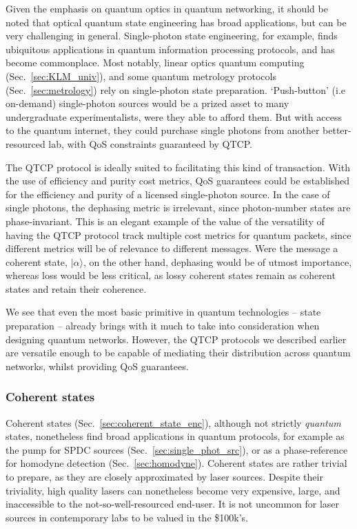 \documentclass[aps, rmp, twocolumn, amsmath, amssymb, nofootinbib, superscriptaddress, longbibliography, floatfix, table-of-contents, eqsecnum]{revtex4-1}
\newcommand{\ket}[1]{|#1\rangle}
\begin{document}
Given the emphasis on quantum optics in quantum networking, it should be noted that optical quantum state engineering has broad applications, but can be very challenging in general. Single-photon state engineering, for example, finds ubiquitous applications in quantum information processing protocols, and has become commonplace. Most notably, linear optics quantum computing (Sec.~\ref{sec:KLM_univ}), and some quantum metrology protocols (Sec.~\ref{sec:metrology}) rely on single-photon state preparation. `Push-button' (i.e on-demand) single-photon sources would be a prized asset to many undergraduate experimentalists, were they able to afford them. But with access to the quantum internet, they could purchase single photons from another better-resourced lab, with QoS constraints guaranteed by QTCP.

The QTCP protocol is ideally suited to facilitating this kind of transaction. With the use of efficiency and purity cost metrics, QoS guarantees could be established for the efficiency and purity of a licensed single-photon source. In the case of single photons, the dephasing metric is irrelevant, since photon-number states are phase-invariant. This is an elegant example of the value of the versatility of having the QTCP protocol track multiple cost metrics for quantum packets, since different metrics will be of relevance to different messages. Were the message a coherent state, $\ket\alpha$, on the other hand, dephasing would be of utmost importance, whereas loss would be less critical, as lossy coherent states remain as coherent states and retain their coherence.

We see that even the most basic primitive in quantum technologies -- state preparation -- already brings with it much to take into consideration when designing quantum networks. However, the QTCP protocols we described earlier are versatile enough to be capable of mediating their distribution across quantum networks, whilst providing QoS guarantees.

%
%

\subsubsection{Coherent states} \label{sec:coherent_states} 

Coherent states (Sec.~\ref{sec:coherent_state_enc}), although not strictly \textit{quantum} states, nonetheless find broad applications in quantum protocols, for example as the pump for SPDC sources (Sec.~\ref{sec:single_phot_src}), or as a phase-reference for homodyne detection (Sec.~\ref{sec:homodyne}). Coherent states are rather trivial to prepare, as they are closely approximated by laser sources. Despite their triviality, high quality lasers can nonetheless become very expensive, large, and inaccessible to the not-so-well-resourced end-user. It is not uncommon for laser sources in contemporary labs to be valued in the \$100k's.
\end{document}
